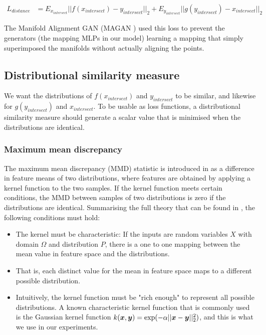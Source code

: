 \begin{equation*}
\begin{split}
L_{distance} &= E_{x_{intersect}}||f(x_{intersect}) - y_{intersect}||_2 + E_{y_{intersect}}||g(y_{intersect}) - x_{intersect}||_2
\end{split}
\end{equation*}

The Manifold Alignment GAN (MAGAN \cite{magan}) used this loss to prevent the generators (the mapping MLPs in our model) learning a mapping that simply superimposed the manifolds without actually aligning the points. 

\subsection{Distributional similarity measure}

We want the distributions of $f(x_{intersect})$ and $y_{intersect}$ to be similar, and likewise for $g(y_{intersect})$ and $x_{intersect}$. To be usable as loss functions, a distributional similarity measure should generate a scalar value that is minimised when the distributions are identical. 

\subsubsection{Maximum mean discrepancy}

The maximum mean discrepancy (MMD) statistic is introduced in \cite{MMDGretton} as a difference in feature means of two distributions, where features are obtained by applying a kernel function to the two samples. If the kernel function meets certain conditions, the MMD between samples of two distributions is zero if the distributions are identical. Summarising the full theory that can be found in \cite{MMDGretton}, the following conditions must hold:

\begin{itemize}
    \item The kernel must be characteristic: If the inputs are random variables $X$ with domain $\Omega$ and distribution $P$, there is a one to one mapping between the mean value in feature space and the distributions. \cite{KernelMeanEmbeddingReview} 
    \item That is, each distinct value for the mean in feature space maps to a different possible distribution. 
    \item Intuitively, the kernel function must be "rich enough" to represent all possible distributions. A known characteristic kernel function that is commonly used is the Gaussian kernel function $k(\boldsymbol{x}, \boldsymbol{y}) = \exp(-\alpha ||\boldsymbol{x} - \boldsymbol{y}||_2^2)$, and this is what we use in our experiments. 
\end{itemize}


